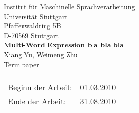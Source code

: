 \documentclass[12pt,leqno,a4paper]{article}
\newcommand{\Titel}{Multi-Word Expression bla bla bla}
\begin{document}
\begin{titlepage}
  \large
  \begin{center}
    Institut f\"ur Maschinelle Sprachverarbeitung\\
    Universit\"at Stuttgart\\
    Pfaffenwaldring 5B\\
    D-70569 Stuttgart\\    
      \vfill
    {\LARGE \bf \Titel} \\
    \vspace{2cm}
    Xiang Yu, Weimeng Zhu\\
    Term paper 
      \vfill
    \begin{tabular}[t]{lr}
    \\
    \\
    {Beginn der Arbeit:} & 01.03.2010\\
    {Ende der Arbeit:} & 31.08.2010\\
    \end{tabular}
  \end{center}

  \normalsize
\end{titlepage}

\newpage
\thispagestyle{empty}










\tableofcontents
\newpage





















\end{document}
